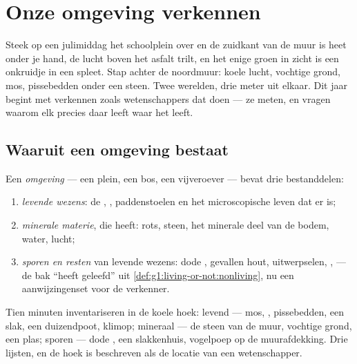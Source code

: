 \chapter{Onze omgeving verkennen}\label{ch:g6:exploring-our-environment}

Steek op een julimiddag het schoolplein over en de zuidkant van de muur
is heet onder je hand, de lucht boven het asfalt trilt, en het enige
groen in zicht is een onkruidje in een spleet. Stap achter de noordmuur:
koele lucht, vochtige grond, mos, pissebedden onder een steen. Twee
werelden, drie meter uit elkaar. Dit jaar begint met  verkennen
zoals wetenschappers dat doen --- ze meten, en vragen waarom elk  precies daar leeft waar het leeft.

\section{Waaruit een omgeving bestaat}

\begin{definition}\label{def:g6:exploring-our-environment:components}
Een \emph{omgeving} --- een plein, een bos, een
vijveroever --- bevat drie  bestanddelen:
\begin{enumerate}
  \item \emph{levende wezens}: de , ,
        paddenstoelen en het microscopische leven dat er is;
  \item \emph{minerale materie}, die  heeft: rots, steen, het minerale deel van de bodem,
        water, lucht;
  \item \emph{sporen en resten} van levende wezens: dode ,
        gevallen hout, uitwerpselen, ,  --- de bak ``heeft
        geleefd'' uit \cref{def:g1:living-or-not:nonliving}, nu een
        aanwijzingenset voor de verkenner.
\end{enumerate}
\end{definition}

\begin{example}\label{ex:g6:exploring-our-environment:inventory}
Tien minuten inventariseren in de koele hoek: levend --- mos, ,
pissebedden, een slak, een duizendpoot, klimop; mineraal --- de steen van
de muur, vochtige grond, een plas; sporen --- dode , een
slakkenhuis, vogelpoep op de muurafdekking. Drie lijsten, en de hoek is
beschreven als de locatie van een wetenschapper.
\end{example}

